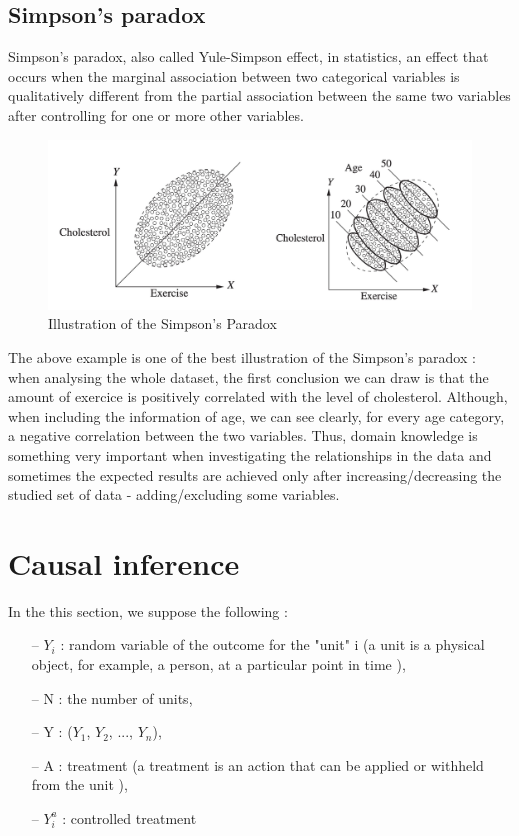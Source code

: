 \documentclass{article}
\begin{document}
 
 \subsection{Simpson's paradox}

Simpson’s paradox, also called Yule-Simpson effect, in statistics, an effect that occurs when the marginal association between two categorical variables is qualitatively different from the partial association between the same two variables after controlling for one or more other variables.

\begin{figure}[h]
\centering
\includegraphics[width=0.7 \textwidth]{figures/simpson.png}
\caption{Illustration of the Simpson’s Paradox\cite{pearl2016causal}}
\end{figure}

The above example is one of the best illustration of the Simpson's paradox : when analysing the whole dataset, the first conclusion we can draw is that the amount of exercice is positively correlated with the level of cholesterol. Although, when including the information of age, we can see clearly, for every age category, a negative correlation between the two variables. Thus, domain knowledge is something very important when investigating the relationships in the data and sometimes the expected results are achieved only after increasing/decreasing the studied set of data - adding/excluding some variables.

\newpage 

\section{Causal inference}

In the this section, we suppose the following : 

\begin{itemize}
\item[--] $Y_{i}$ : random variable of the outcome for the "unit" i  (a unit is a physical object, for example, a person, at a particular point in time \cite{rubin2005causal}),
\item[--] N : the number of units,
\item[--] Y : ($Y_{1}$, $Y_{2}$, ..., $Y_{n}$),
\item[--] A : treatment (a treatment is an action that can be applied or withheld from the unit \cite{rubin2005causal}),
\item[--] $Y_{i}^{a}$ : controlled treatment 
\end{itemize}
\end{document}
